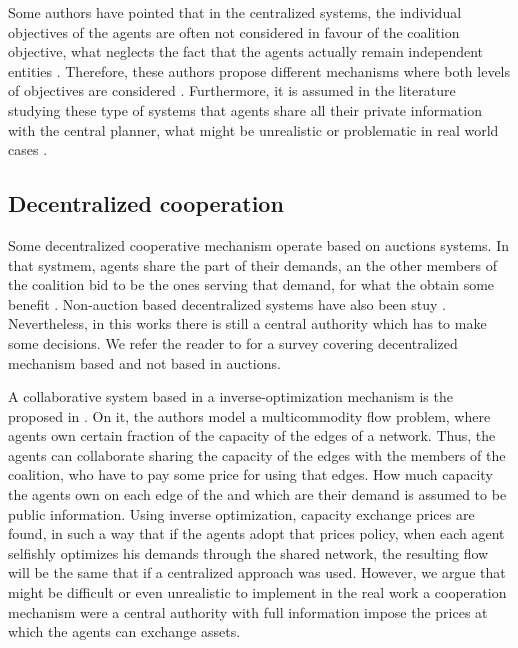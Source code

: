 \documentclass[review]{elsarticle}
\begin{document}
Some authors have pointed that in the centralized systems, the individual objectives
of the agents are often not considered in favour of the coalition objective, what neglects the fact that the agents actually remain independent entities \cite{DEFRYN2018891}. Therefore,
these authors propose different mechanisms where both levels of objectives are
considered \cite{DEFRYN20191} \cite{VANOVERMEIRE2014125}. Furthermore, it is assumed
in the literature studying these type of systems that agents share all their private information
with the central planner, what might be unrealistic or problematic in real world cases \cite{SERRANO2017} \cite{ZENG2015}.


\subsection{Decentralized cooperation}

Some decentralized cooperative mechanism operate based on auctions systems. In that systmem, agents share
the part of their demands, an the other members of the coalition bid to be the
ones serving that demand, for what the obtain some benefit \cite{LEDYARD2002} \cite{MAHR201099}. Non-auction based decentralized systems have also been stuy \cite{HERNANDEZ2014} \cite{WANG2014} . Nevertheless, in this works there is still a central authority which has to make some decisions. We refer the reader to \cite{GANTERER2017} for a survey covering decentralized mechanism based and not based in auctions.

A collaborative system based in a
inverse-optimization mechanism is the proposed in \cite{AGARWAL2008520}. On it,
the authors model a multicommodity flow problem, where agents own certain
fraction of the capacity of the edges of a network. Thus, the agents can
collaborate sharing the capacity of the edges with the members of the coalition,
who have to pay some price for using that edges. How much capacity the agents
own on each edge of the and which are their demand is assumed to be public
information. Using inverse optimization, capacity exchange prices are
found, in such a way that if the agents adopt that prices policy, when each
agent selfishly optimizes his demands through the shared network, the resulting
flow will be the same that if a centralized approach was used. However, we argue that might be difficult or even unrealistic to implement in the real work a cooperation mechanism were a central authority with full information impose the prices at which the agents can exchange assets.
\end{document}
